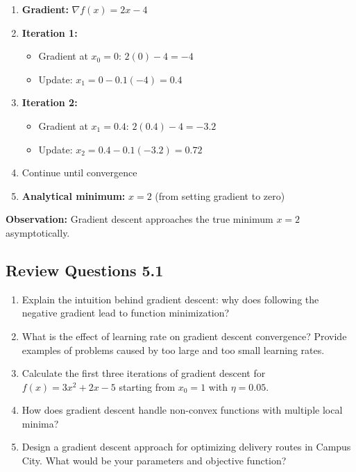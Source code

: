 \documentclass[
  letterpaper,
  DIV=11,
  numbers=noendperiod]{scrreprt}
\providecommand{\tightlist}{%
  \setlength{\itemsep}{0pt}\setlength{\parskip}{0pt}}
\begin{document}
\begin{enumerate}
\def\labelenumi{\arabic{enumi}.}
\tightlist
\item
  \textbf{Gradient:} \(\nabla f(x) = 2x - 4\)
\item
  \textbf{Iteration 1:}

  \begin{itemize}
  \tightlist
  \item
    Gradient at \(x_0 = 0\): \(2(0) - 4 = -4\)
  \item
    Update: \(x_1 = 0 - 0.1(-4) = 0.4\)
  \end{itemize}
\item
  \textbf{Iteration 2:}

  \begin{itemize}
  \tightlist
  \item
    Gradient at \(x_1 = 0.4\): \(2(0.4) - 4 = -3.2\)
  \item
    Update: \(x_2 = 0.4 - 0.1(-3.2) = 0.72\)
  \end{itemize}
\item
  Continue until convergence
\item
  \textbf{Analytical minimum:} \(x = 2\) (from setting gradient to zero)
\end{enumerate}

\textbf{Observation:} Gradient descent approaches the true minimum
\(x = 2\) asymptotically.

\subsection{Review Questions 5.1}\label{review-questions-5.1}

\begin{enumerate}
\def\labelenumi{\arabic{enumi}.}
\item
  Explain the intuition behind gradient descent: why does following the
  negative gradient lead to function minimization?
\item
  What is the effect of learning rate on gradient descent convergence?
  Provide examples of problems caused by too large and too small
  learning rates.
\item
  Calculate the first three iterations of gradient descent for
  \(f(x) = 3x^2 + 2x - 5\) starting from \(x_0 = 1\) with
  \(\eta = 0.05\).
\item
  How does gradient descent handle non-convex functions with multiple
  local minima?
\item
  Design a gradient descent approach for optimizing delivery routes in
  Campus City. What would be your parameters and objective function?
\end{enumerate}
\end{document}
